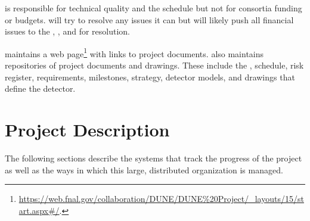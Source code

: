  is responsible for technical quality and the schedule but not
for consortia funding or budgets.   will try to resolve any issues it can but will likely push all
financial issues to the , , and  for resolution.

 maintains a web
page\footnote{\url{https://web.fnal.gov/collaboration/DUNE/DUNE\%20Project/\_layouts/15/start.aspx\#/}.}
with links to project documents.  also maintains repositories of
project documents and drawings. These include the ,
schedule, risk register, requirements, milestones, strategy, detector
models, and drawings that define the  detector.

\section{ Project Description}

The following sections describe the systems that track the progress
of the  project as well as the ways in which this large, distributed organization is managed.

